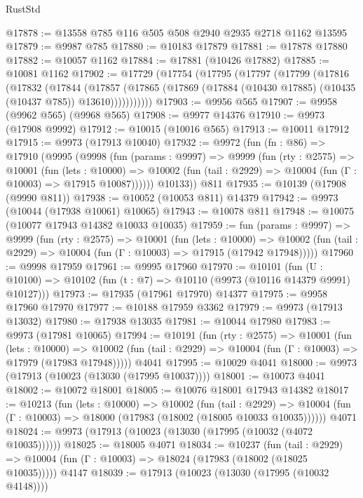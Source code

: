 \begin{lexlean}{RustStd}
\begin{coremodule}
@17878 := @13558 @785 @116 @505 @508 @2940 @2935 @2718 @1162 @13595
@17879 := @9987 @785
@17880 := @10183 @17879
@17881 := @17878 @17880
@17882 := @10057 @1162
@17884 := @17881 (@10426 @17882)
@17885 := @10081 @1162
@17902 := @17729
    (@17754
      (@17795
        (@17797
          (@17799
            (@17816
              (@17832
                (@17844
                  (@17857
                    (@17865 (@17869 (@17884 (@10430 @17885) (@10435 (@10437 @785)) @13610)))))))))))
@17903 := @9956 @565
@17907 := @9958 (@9962 @565) (@9968 @565)
@17908 := @9977 @14376
@17910 := @9973 (@17908 @9992)
@17912 := @10015 (@10016 @565)
@17913 := @10011 @17912
@17915 := @9973 (@17913 @10040)
@17932 := @9972
    (fun (fn : @86) =>
    @17910
      (@9995
        (@9998
          (fun (params : @9997) =>
          @9999
            (fun (rty : @2575) =>
            @10001
              (fun (lets : @10000) =>
              @10002 (fun (tail : @2929) => @10004 (fun (Γ : @10003) => @17915 @10087))))))
        @10133))
    @811
@17935 := @10139 (@17908 (@9990 @811))
@17938 := @10052 (@10053 @811) @14379
@17942 := @9973 (@10044 (@17938 @10061) @10065)
@17943 := @10078 @811
@17948 := @10075 (@10077 @17943 @14382 @10033 @10035)
@17959 := fun (params : @9997) =>
  @9999
    (fun (rty : @2575) =>
    @10001
      (fun (lets : @10000) =>
      @10002 (fun (tail : @2929) => @10004 (fun (Γ : @10003) => @17915 (@17942 @17948)))))
@17960 := @9998 @17959
@17961 := @9995 @17960
@17970 := @10101
    (fun (U : @10100) => @10102 (fun (t : @7) => @10110 (@9973 (@10116 @14379 @9991) @10127)))
@17973 := @17935 (@17961 @17970) @14377
@17975 := @9958 @17960 @17970
@17977 := @10188 @17959 @3362
@17979 := @9973 (@17913 @13032)
@17980 := @17938 @13035
@17981 := @10044 @17980
@17983 := @9973 (@17981 @10065)
@17994 := @10191
    (fun (rty : @2575) =>
    @10001
      (fun (lets : @10000) =>
      @10002 (fun (tail : @2929) => @10004 (fun (Γ : @10003) => @17979 (@17983 @17948)))))
    @4041
@17995 := @10029 @4041
@18000 := @9973 (@17913 (@10023 (@13030 (@17995 @10037))))
@18001 := @10073 @4041
@18002 := @10072 @18001
@18005 := @10076 @18001 @17943 @14382
@18017 := @10213
    (fun (lets : @10000) =>
    @10002
      (fun (tail : @2929) =>
      @10004 (fun (Γ : @10003) => @18000 (@17983 (@18002 (@18005 @10033 @10035))))))
    @4071
@18024 := @9973 (@17913 (@10023 (@13030 (@17995 (@10032 (@4072 @10035))))))
@18025 := @18005 @4071
@18034 := @10237
    (fun (tail : @2929) => @10004 (fun (Γ : @10003) => @18024 (@17983 (@18002 (@18025 @10035)))))
    @4147
@18039 := @17913 (@10023 (@13030 (@17995 (@10032 @4148))))

\end{coremodule}
\end{lexlean}
